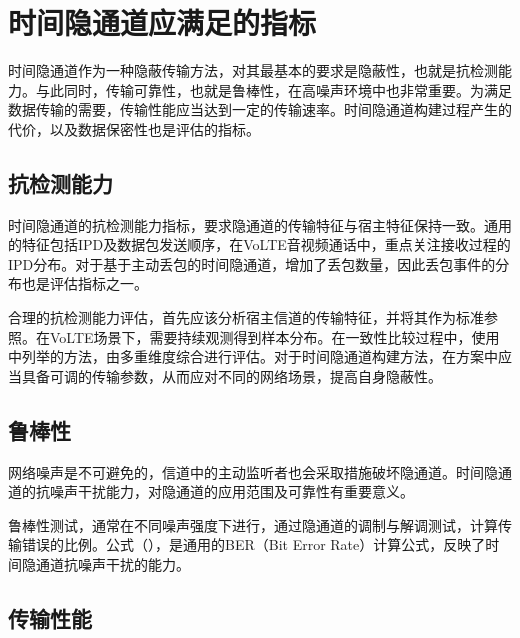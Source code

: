 \section{时间隐通道应满足的指标}
\label{chap:backinfo:metric}

时间隐通道作为一种隐蔽传输方法，对其最基本的要求是隐蔽性，也就是抗检测能力。与此同时，传输可靠性，也就是鲁棒性，在高噪声环境中也非常重要。为满足数据传输的需要，传输性能应当达到一定的传输速率。时间隐通道构建过程产生的代价，以及数据保密性也是评估的指标。

\subsection{抗检测能力}
\label{chap:backinfo:metric:undetectability}

时间隐通道的抗检测能力指标，要求隐通道的传输特征与宿主特征保持一致。通用的特征包括IPD及数据包发送顺序，在VoLTE音视频通话中，重点关注接收过程的IPD分布。对于基于主动丢包的时间隐通道，增加了丢包数量，因此丢包事件的分布也是评估指标之一。

合理的抗检测能力评估，首先应该分析宿主信道的传输特征，并将其作为标准参照。在VoLTE场景下，需要持续观测得到样本分布。在一致性比较过程中，使用中列举的方法，由多重维度综合进行评估。对于时间隐通道构建方法，在方案中应当具备可调的传输参数，从而应对不同的网络场景，提高自身隐蔽性。

\subsection{鲁棒性}
\label{chap:backinfo:metric:robustness}

网络噪声是不可避免的，信道中的主动监听者也会采取措施破坏隐通道。时间隐通道的抗噪声干扰能力，对隐通道的应用范围及可靠性有重要意义。


鲁棒性测试，通常在不同噪声强度下进行，通过隐通道的调制与解调测试，计算传输错误的比例。公式（），是通用的BER（Bit Error Rate）计算公式，反映了时间隐通道抗噪声干扰的能力。

\subsection{传输性能}
\label{chap:backinfo:metric:throughput}

